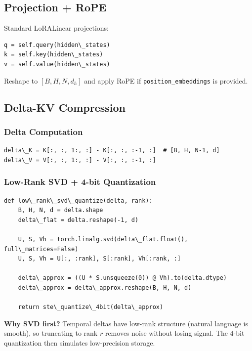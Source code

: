 \subsection{Projection + RoPE}

Standard LoRALinear projections:

\begin{lstlisting}
q = self.query(hidden\_states)
k = self.key(hidden\_states)
v = self.value(hidden\_states)
\end{lstlisting}

Reshape to $[B, H, N, d_h]$ and apply RoPE if \texttt{position\_embeddings} is provided.

\subsection{Delta-KV Compression}

\subsubsection{Delta Computation}

\begin{lstlisting}
delta\_K = K[:, :, 1:, :] - K[:, :, :-1, :]  # [B, H, N-1, d]
delta\_V = V[:, :, 1:, :] - V[:, :, :-1, :]
\end{lstlisting}

\subsubsection{Low-Rank SVD + 4-bit Quantization}

\begin{lstlisting}
def low\_rank\_svd\_quantize(delta, rank):
    B, H, N, d = delta.shape
    delta\_flat = delta.reshape(-1, d)
    
    U, S, Vh = torch.linalg.svd(delta\_flat.float(), full\_matrices=False)
    U, S, Vh = U[:, :rank], S[:rank], Vh[:rank, :]
    
    delta\_approx = ((U * S.unsqueeze(0)) @ Vh).to(delta.dtype)
    delta\_approx = delta\_approx.reshape(B, H, N, d)
    
    return ste\_quantize\_4bit(delta\_approx)
\end{lstlisting}

\textbf{Why SVD first?} Temporal deltas have low-rank structure (natural language is 
smooth), so truncating to rank $r$ removes noise without losing signal. The 
4-bit quantization then simulates low-precision storage.

